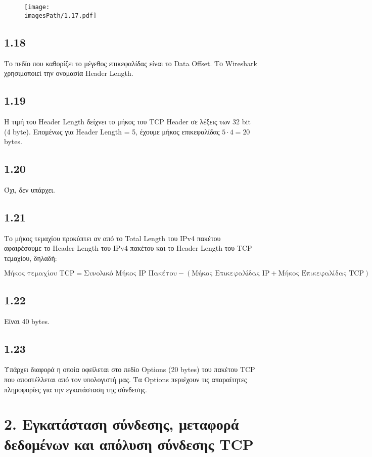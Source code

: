 		\begin{figure}[H]
			\texttt{[image: \\imagesPath/1.17.pdf]}
		\end{figure}
		
		\subsection*{1.18}
			Το πεδίο που καθορίζει το μέγεθος επικεφαλίδας είναι το Data Offset. Το Wireshark χρησιμοποιεί την ονομασία Header Length.
		
		\subsection*{1.19} 
			Η τιμή του Header Length δείχνει το μήκος του TCP Header σε λέξεις των 32 bit (4 byte). Επομένως για Header Length = 5, έχουμε μήκος επικεφαλίδας $5 \cdot 4 = 20$ bytes.
		
		\subsection*{1.20} 
			Όχι, δεν υπάρχει.
		
		\subsection*{1.21} 
			Το μήκος τεμαχίου προκύπτει αν από το Total Length του IPv4 πακέτου αφαιρέσουμε το Header Length του IPv4 πακέτου και το Header Length του TCP τεμαχίου, δηλαδή:
			
			\[
				\text{Μήκος τεμαχίου TCP} = \text{Συνολικό Μήκος IP Πακέτου} - (\text{Μήκος Επικεφαλίδας IP} + \text{Μήκος Επικεφαλίδας TCP}) 
			\]
		
		\subsection*{1.22} 
			Είναι 40 bytes.
			
		\subsection*{1.23}
			Υπάρχει διαφορά η οποία οφείλεται στο πεδίο Options (20 bytes) του πακέτου TCP που αποστέλλεται από τον υπολογιστή μας. Τα Options περιέχουν τις απαραίτητες πληροφορίες για την εγκατάσταση της σύνδεσης.
			
	\section*{2. Εγκατάσταση σύνδεσης, μεταφορά δεδομένων και απόλυση σύνδεσης TCP}
		

